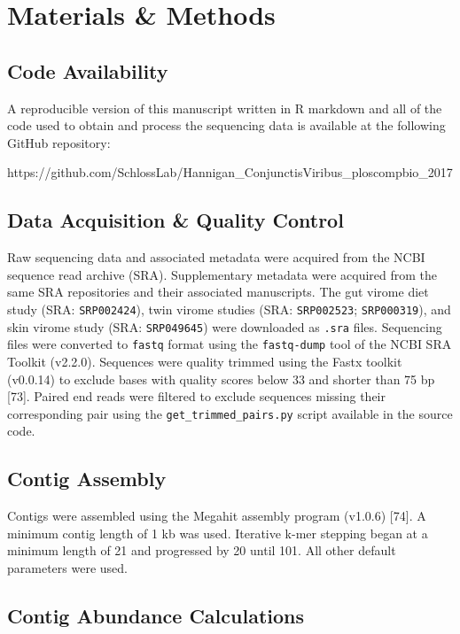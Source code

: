 \documentclass[12pt,]{article}
\begin{document}
\section{Materials \& Methods}\label{materials-methods}

\subsection{Code Availability}\label{code-availability}

A reproducible version of this manuscript written in R markdown and all
of the code used to obtain and process the sequencing data is available
at the following GitHub repository:

https://github.com/SchlossLab/Hannigan\_ConjunctisViribus\_ploscompbio\_2017

\subsection{Data Acquisition \& Quality
Control}\label{data-acquisition-quality-control}

Raw sequencing data and associated metadata were acquired from the NCBI
sequence read archive (SRA). Supplementary metadata were acquired from
the same SRA repositories and their associated manuscripts. The gut
virome diet study (SRA: \texttt{SRP002424}), twin virome studies (SRA:
\texttt{SRP002523}; \texttt{SRP000319}), and skin virome study (SRA:
\texttt{SRP049645}) were downloaded as \texttt{.sra} files. Sequencing
files were converted to \texttt{fastq} format using the
\texttt{fastq-dump} tool of the NCBI SRA Toolkit (v2.2.0). Sequences
were quality trimmed using the Fastx toolkit (v0.0.14) to exclude bases
with quality scores below 33 and shorter than 75 bp {[}73{]}. Paired end
reads were filtered to exclude sequences missing their corresponding
pair using the \texttt{get\_trimmed\_pairs.py} script available in the
source code.

\subsection{Contig Assembly}\label{contig-assembly}

Contigs were assembled using the Megahit assembly program (v1.0.6)
{[}74{]}. A minimum contig length of 1 kb was used. Iterative k-mer
stepping began at a minimum length of 21 and progressed by 20 until 101.
All other default parameters were used.

\subsection{Contig Abundance
Calculations}\label{contig-abundance-calculations}
\end{document}
